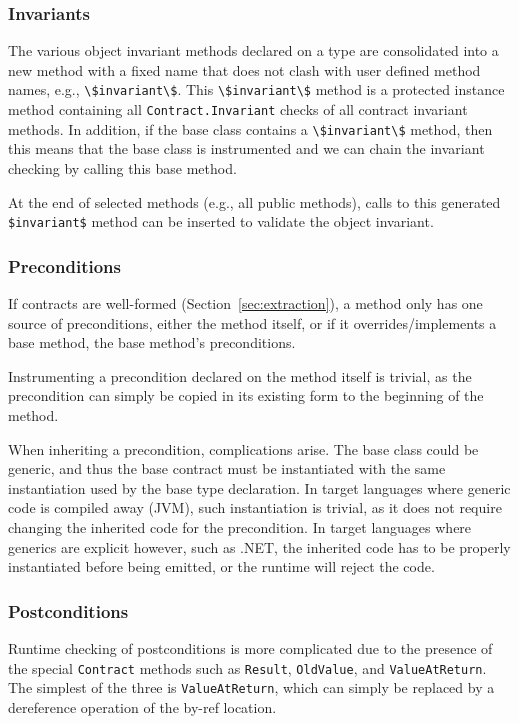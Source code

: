 \documentclass{sig-alternate}
\newcommand{\code}[1]{\lstinline{#1}}
\begin{document}
\subsubsection{Invariants}
\noindent
The various object invariant methods declared on a type are
consolidated into a new method with a fixed name that does not clash
with user defined method names, e.g., \code{\$invariant\$}. This
\code{\$invariant\$} method is a protected instance method containing
all \code{Contract.Invariant} checks of all contract invariant
methods. In addition, if the base class contains a \code{\$invariant\$}
method, then this means that the base class is instrumented and we can
chain the invariant checking by calling this base method.

At the end of selected methods (e.g., all public methods), calls to
this generated \code{$invariant$} method can be inserted to validate
the object invariant.

\subsubsection{Preconditions}
\noindent
If contracts are well-formed (Section~\ref{sec:extraction}), a method only has
one source of preconditions, either the method itself, or if it
overrides/implements a base method, the base method's preconditions.

Instrumenting a precondition declared on the method itself is trivial,
as the precondition can simply be copied in its existing form to the
beginning of the method. 

When inheriting a precondition, complications arise. The base class
could be generic, and thus the base contract must be instantiated with
the same instantiation used by the base type declaration. In target
languages where generic code is compiled away (JVM), such
instantiation is trivial, as it does not require changing the
inherited code for the precondition. In target languages where
generics are explicit however, such as .NET, the inherited code has to
be properly instantiated before being emitted, or the runtime will
reject the code.

\subsubsection{Postconditions}
\noindent
Runtime checking of postconditions is more complicated due to the
presence of the special \code{Contract} methods such as \code{Result},
\code{OldValue}, and \code{ValueAtReturn}. The simplest of the three
is \code{ValueAtReturn}, which can simply be replaced by a dereference
operation of the by-ref location. 
\end{document}
